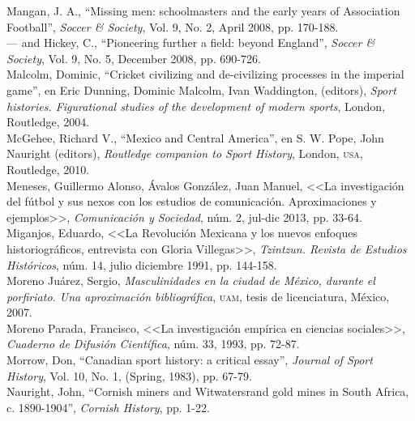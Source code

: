 \documentclass[11pt,a5paper,twoside]{book} %
\begin{document}
\begin{hangparas}{1cm}{1}
\noindent Mangan, J. A., “Missing men: schoolmasters and the early years of Association Football”,
\emph{Soccer \& Society}, Vol. 9, No. 2, April 2008, pp. 170-188. \\

\noindent --- and Hickey, C., “Pioneering further a field: beyond England”, \emph{Soccer \& Society}, Vol. 9, No. 5, December 2008, pp. 690-726. \\

\noindent Malcolm, Dominic, “Cricket civilizing and de-civilizing processes in the imperial game”, en Eric Dunning, Dominic Malcolm, Ivan Waddington, (editors), \emph{Sport histories. Figurational studies of the development of modern sports}, London, Routledge, 2004. \\

\noindent McGehee, Richard V., “Mexico and Central America”, en S. W. Pope, John Nauright
(editors), \emph{Routledge companion to Sport History}, London, \textsc{usa}, Routledge, 2010. \\

\noindent Meneses, Guillermo Alonso, Ávalos González, Juan Manuel, <<La investigación del fútbol y sus nexos con los estudios de comunicación. Aproximaciones y ejemplos>>, \emph{Comunicación y Sociedad}, núm. 2, jul-dic 2013, pp. 33-64. \\

\noindent Miganjos, Eduardo, <<La Revolución Mexicana y los nuevos enfoques historiográficos, entrevista con Gloria Villegas>>, \emph{Tzintzun. Revista de Estudios Históricos}, núm. 14, julio diciembre 1991, pp. 144-158. \\

\noindent Moreno Juárez, Sergio, \emph{Masculinidades en la ciudad de México, durante el porfiriato. Una aproximación bibliográfica}, \textsc{uam}, tesis de licenciatura, México, 2007. \\

\noindent Moreno Parada, Francisco, <<La investigación empírica en ciencias sociales>>, \emph{Cuaderno de Difusión Científica}, núm. 33, 1993, pp. 72-87. \\

\noindent Morrow, Don, “Canadian sport history: a critical essay”, \emph{Journal of Sport History}, Vol. 10, No. 1, (Spring, 1983), pp. 67-79. \\

\noindent Nauright, John, “Cornish miners and Witwatersrand gold mines in South Africa, c. 1890-1904”, \emph{Cornish History}, pp. 1-22. \\


\end{hangparas}
\end{document}
